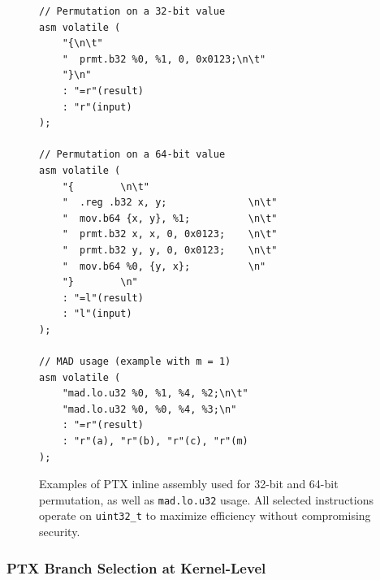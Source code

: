\documentclass[10pt,conference]{IEEEtran}
\begin{document}

\begin{figure}[!ht]
\centering
\begin{lstlisting}[style=mintedcpp]
// Permutation on a 32-bit value
asm volatile (
    "{\n\t"
    "  prmt.b32 %0, %1, 0, 0x0123;\n\t"
    "}\n"
    : "=r"(result)
    : "r"(input)
);

// Permutation on a 64-bit value
asm volatile (
    "{        \n\t"
    "  .reg .b32 x, y;              \n\t"
    "  mov.b64 {x, y}, %1;          \n\t"
    "  prmt.b32 x, x, 0, 0x0123;    \n\t"
    "  prmt.b32 y, y, 0, 0x0123;    \n\t"
    "  mov.b64 %0, {y, x};          \n"
    "}        \n"
    : "=l"(result)
    : "l"(input)
);

// MAD usage (example with m = 1)
asm volatile (
    "mad.lo.u32 %0, %1, %4, %2;\n\t"
    "mad.lo.u32 %0, %0, %4, %3;\n"
    : "=r"(result)
    : "r"(a), "r"(b), "r"(c), "r"(m)
);
\end{lstlisting}
\caption{
Examples of PTX inline assembly used for 32-bit and 64-bit permutation, as well as \texttt{mad.lo.u32} usage.  
All selected instructions operate on \texttt{uint32\_t} to maximize efficiency without compromising security.
}
\label{fig:ptx-snippets}
\end{figure}




\subsubsection{PTX Branch Selection at Kernel-Level}
\end{document}
